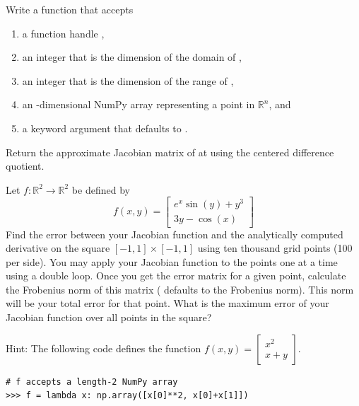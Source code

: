 \begin{problem}
\leavevmode
Write a function that accepts
\begin{enumerate}
\item a function handle ,
\item an integer  that is the dimension of the domain of ,
\item an integer  that is the dimension of the range of ,
\item an -dimensional NumPy array  representing a point in $\mathbb{R}^n$, and
\item a keyword argument  that defaults to .
\end{enumerate}
Return the approximate Jacobian matrix of  at  using the centered difference quotient.
\end{problem}
\begin{problem}
\item Let $f: \mathbb{R}^2 \to \mathbb{R}^2$ be defined by
%
\begin{equation*}
f(x, y) =
\left[\begin{array}{c}
e^{x} \sin(y) + y^3 \\
3y - \cos(x)
\end{array}\right]
\end{equation*}
%
Find the error between your Jacobian function and the analytically computed derivative on the square $[-1,1] \times [-1,1]$ using ten thousand grid points (100 per side).
You may apply your Jacobian function to the points one at a time using a double  loop.  Once you get the error matrix for a given point, calculate the Frobenius norm of this matrix ( defaults to the Frobenius norm).  This norm will be your total error for that point.
What is the maximum error of your Jacobian function over all points in the square?

Hint: The following code defines the function
$f(x,y) = \left[\begin{array}{c} x^2 \\ x+y \end{array}\right]$.

\begin{lstlisting}
# f accepts a length-2 NumPy array
>>> f = lambda x: np.array([x[0]**2, x[0]+x[1]])
\end{lstlisting}
\end{problem}


